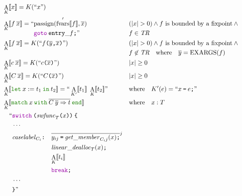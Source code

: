 \documentclass[a4paper,fleqn]{article}
\newcommand{\kwlet}{\mbox{\color{mygreen}\ttfamily let}}
\newcommand{\kwin}{\mbox{\color{mygreen}\ttfamily in}}
\newcommand{\kwmatch}{\mbox{\color{mygreen}\ttfamily match}}
\newcommand{\kwwith}{\mbox{\color{mygreen}\ttfamily with}}
\newcommand{\kwend}{\mbox{\color{mygreen}\ttfamily end}}
\newcommand{\letin}[3]{\kwlet\:#1:=#2\:\kwin\:#3}
\newcommand{\omatch}[2]{\kwmatch\:#1\:\kwwith\:{#2}\:\kwend}
\DeclareMathOperator{\EXARGS}{EXARGS}
\newcommand{\BRA}[1]{\llbracket #1 \rrbracket}
\newcommand{\tr}{\mathit{TR}}
\newcommand{\ldq}{\text{``}}
\newcommand{\rdq}{\text{''}}
\newcommand{\dq}[1]{\text{``}#1\text{''}}
\newcommand{\ttparen}[1]{\texttt{(}#1\texttt{)}}
\newcommand{\ttlbrace}{\texttt{\char '173}}
\newcommand{\ttrbrace}{\texttt{\char '175}}
\newcommand{\tteq}{\texttt{=}}
\newcommand{\ttsemi}{\texttt{;}}
\newcommand{\ttcomma}{\texttt{,}}
\newcommand{\ttcolon}{\texttt{:}}
\newcommand{\kwswitch}{\mbox{\color{myviolet}\ttfamily switch}}
\newcommand{\kwbreak}{\mbox{\color{myviolet}\ttfamily break}}
\newcommand{\kwgoto}{\mbox{\color{myviolet}\ttfamily goto}}
\DeclareMathOperator{\passign}{passign}
\DeclareMathOperator{\fvarsop}{fvars}
\newcommand{\fvarsd}[1]{\fvarsop'\BRA{#1}}
\DeclareMathOperator{\Aop}{A}
\newcommand{\A}[2]{\Aop_{#1}\BRA{#2}}
\newcommand{\rep}[1]{\overline{#1}}
\newcommand{\repi}[2]{\overline{#1}^{#2}}
\begin{document}
\begin{align*}
  &\A{K}{x} = K(\dq{x}) \\
  &\A{K}{f\:\rep{x}} =
      \begin{aligned}[t] \ldq & {\passign(\fvarsd{f}, \rep{x})} \\ & \kwgoto\:\mathtt{entry\_}f\ttsemi \rdq \end{aligned}
    && \begin{aligned}[t] & (|x| > 0) \wedge \text{$f$ is bounded by a fixpoint} \wedge {} \\ & f \in \tr \end{aligned} \\
  &\A{K}{f\:\rep{x}} = K(\dq{f\ttparen{\rep{y}\ttcomma \rep{x}}})
    && \begin{aligned}[t] & (|x| > 0) \wedge \text{$f$ is bounded by a fixpoint} \wedge {} \\ & f \not\in \tr \quad \text{where} \quad \rep{y} = \EXARGS(f) \end{aligned} \\
      &\A{K}{c\:\rep{x}} = K(\dq{c\ttparen{\rep{x}}})                                   && |x| \geq 0 \\
  &\A{K}{C\:\rep{x}} = K(\dq{C\ttparen{\rep{x}}})                                   && |x| \geq 0 \\
  &\A{K}{\letin{x}{t_1}{t_2}} = \ldq \A{K'}{t_1}\; \A{K}{t_2} \rdq
    && \text{where}\quad K'(e) = \dq{x\:\tteq\:e\ttsemi} \\
  &\A{K}{\omatch{x}{\rep{C\:\rep{y}\Rightarrow t}}} && \text{where}\quad x : T \\
     & \quad\begin{alignedat}{2}
       \ldq & \kwswitch\:\ttparen{\mathit{swfunc}_T\ttparen{x}}\:\ttlbrace \\
            & \cdots \\
            & \mathit{caselabel}_{C_i}\ttcolon\quad
              \begin{aligned}[t]
              & \repi{y_{ij}\:\tteq\:\mathit{get\_member}_{C_i j}(x)\ttsemi}{j} \\
              & \mathit{linear\_dealloc}_{T}(x)\ttsemi \\
              & {\A{K}{t_i}} \\
              & \kwbreak\ttsemi
              \end{aligned} \\
            & \cdots \\
            & \ttrbrace\rdq
       \end{alignedat} \\

\end{align*}
\end{document}
